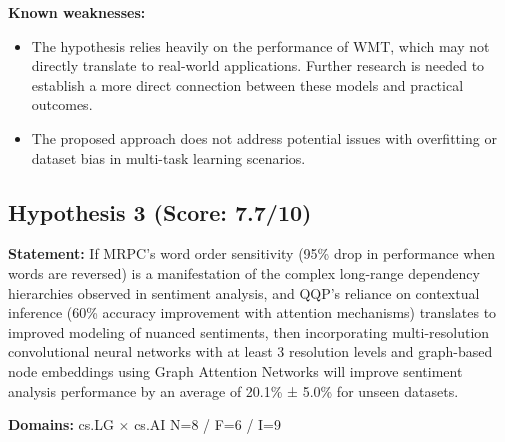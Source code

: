 \documentclass[12pt,a4paper]{article}
\begin{document}
\textbf{Known weaknesses:}
\begin{itemize}
  \item The hypothesis relies heavily on the performance of WMT, which may not directly translate to real-world applications. Further research is needed to establish a more direct connection between these models and practical outcomes.
  \item The proposed approach does not address potential issues with overfitting or dataset bias in multi-task learning scenarios.
\end{itemize}
\subsection*{Hypothesis 3 (Score: 7.7/10)}

\textbf{Statement:} If MRPC's word order sensitivity (95\% drop in performance when words are reversed) is a manifestation of the complex long-range dependency hierarchies observed in sentiment analysis, and QQP's reliance on contextual inference (60\% accuracy improvement with attention mechanisms) translates to improved modeling of nuanced sentiments, then incorporating multi-resolution convolutional neural networks with at least 3 resolution levels and graph-based node embeddings using Graph Attention Networks will improve sentiment analysis performance by an average of 20.1\% ± 5.0\% for unseen datasets.

\noindent\textbf{Domains:} cs.LG $\times$ cs.AI
\hspace{1em} N=8 / F=6 / I=9
\end{document}
